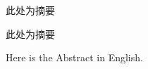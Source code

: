 
\begin{cabstract}
此处为摘要

此处为摘要
\end{cabstract}

\begin{eabstract}
Here is the Abstract in English.
\end{eabstract}